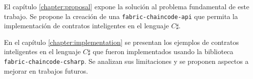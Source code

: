El capítulo \ref{chapter:proposal} expone la solución al problema fundamental de este trabajo. Se propone la creación de una \texttt{fabric-chaincode-api} que permita la implementación de contratos inteligentes en el lenguaje $ C\sharp $.

En el capítulo \ref{chapter:implementation} se presentan los ejemplos de contratos inteligentes en el lenguaje $ C\sharp $ que fueron implementados usando la biblioteca \texttt{fabric-chaincode-csharp}. Se analizan sus limitaciones y se proponen aspectos a mejorar en trabajos futuros.













